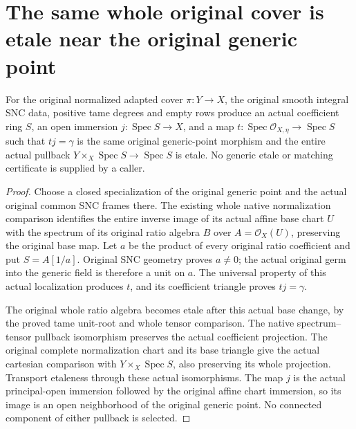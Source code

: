 \section{The same whole original cover is etale near the original generic point}

\begin{theorem}
\label{thm:kn-canonical-original-etale-generic-neighborhood}
\leanok
For the original normalized adapted cover $\pi:Y\to X$, the original
smooth integral SNC data, positive tame degrees and empty rows produce
an actual coefficient ring $S$, an open immersion
$j:\operatorname{Spec}S\to X$, and a map
$t:\operatorname{Spec}\mathcal O_{X,\eta}\to\operatorname{Spec}S$
such that $t j=\gamma$ is the same original generic-point morphism and
the entire actual pullback $Y\times_X\operatorname{Spec}S\to
\operatorname{Spec}S$ is etale. No generic etale or matching certificate
is supplied by a caller.
\end{theorem}
\begin{proof}
Choose a closed specialization of the original generic point and the
actual original common SNC frames there. The existing whole native
normalization comparison identifies the entire inverse image of its
actual affine base chart $U$ with the spectrum of its original ratio
algebra $B$ over $A=\mathcal O_X(U)$, preserving the original base map.
Let $a$ be the product of every original ratio coefficient and put
$S=A[1/a]$. Original SNC geometry proves $a\ne0$; the actual original
germ into the generic field is therefore a unit on $a$. The universal
property of this actual localization produces $t$, and its coefficient
triangle proves $t j=\gamma$.

The original whole ratio algebra becomes etale after this actual base
change, by the proved tame unit-root and whole tensor comparison.
The native spectrum--tensor pullback isomorphism preserves the actual
coefficient projection. The original complete normalization chart and
its base triangle give the actual cartesian comparison with
$Y\times_X\operatorname{Spec}S$, also preserving its whole projection.
Transport etaleness through these actual isomorphisms. The map $j$ is
the actual principal-open immersion followed by the original affine
chart immersion, so its image is an open neighborhood of the original
generic point. No connected component of either pullback is selected.
\end{proof}
